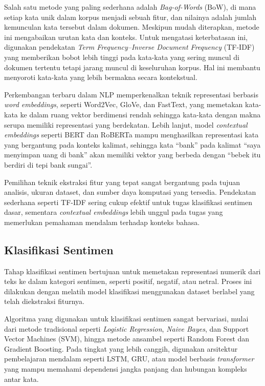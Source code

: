 Salah satu metode yang paling sederhana adalah \textit{Bag-of-Words} (BoW), di mana setiap kata unik dalam korpus menjadi sebuah fitur, dan nilainya adalah jumlah kemunculan kata tersebut dalam dokumen. Meskipun mudah diterapkan, metode ini mengabaikan urutan kata dan konteks. Untuk mengatasi keterbatasan ini, digunakan pendekatan \textit{Term Frequency–Inverse Document Frequency} (TF-IDF) yang memberikan bobot lebih tinggi pada kata-kata yang sering muncul di dokumen tertentu tetapi jarang muncul di keseluruhan korpus. Hal ini membantu menyoroti kata-kata yang lebih bermakna secara kontekstual.

Perkembangan terbaru dalam NLP memperkenalkan teknik representasi berbasis \textit{word embeddings}, seperti Word2Vec, GloVe, dan FastText, yang memetakan kata-kata ke dalam ruang vektor berdimensi rendah sehingga kata-kata dengan makna serupa memiliki representasi yang berdekatan. Lebih lanjut, model \textit{contextual embeddings} seperti BERT dan RoBERTa mampu menghasilkan representasi kata yang bergantung pada konteks kalimat, sehingga kata “bank” pada kalimat “saya menyimpan uang di bank” akan memiliki vektor yang berbeda dengan “bebek itu berdiri di tepi bank sungai”.

Pemilihan teknik ekstraksi fitur yang tepat sangat bergantung pada tujuan analisis, ukuran dataset, dan sumber daya komputasi yang tersedia. Pendekatan sederhana seperti TF-IDF sering cukup efektif untuk tugas klasifikasi sentimen dasar, sementara \textit{contextual embeddings} lebih unggul pada tugas yang memerlukan pemahaman mendalam terhadap konteks bahasa.

\subsection{Klasifikasi Sentimen}

Tahap klasifikasi sentimen bertujuan untuk memetakan representasi numerik dari teks ke dalam kategori sentimen, seperti positif, negatif, atau netral. Proses ini dilakukan dengan melatih model klasifikasi menggunakan dataset berlabel yang telah diekstraksi fiturnya.

Algoritma yang digunakan untuk klasifikasi sentimen sangat bervariasi, mulai dari metode tradisional seperti \textit{Logistic Regression}, \textit{Naive Bayes}, dan Support Vector Machines (SVM), hingga metode ansambel seperti Random Forest dan Gradient Boosting. Pada tingkat yang lebih canggih, digunakan arsitektur pembelajaran mendalam seperti LSTM, GRU, atau model berbasis \textit{transformer} yang mampu memahami dependensi jangka panjang dan hubungan kompleks antar kata.

